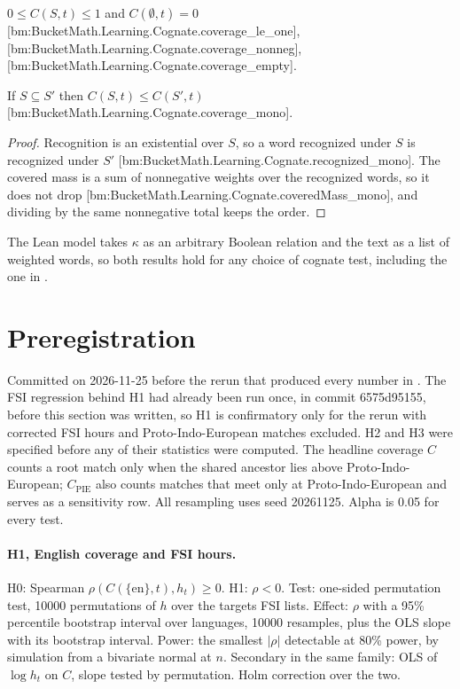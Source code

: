 \documentclass[11pt]{article}
\newcommand{\bm}[1]{{\small[bm:#1]}}
\begin{document}
\begin{lemma}[Bounds]
\label{lem:bounds}
$0\le C(S,t)\le 1$ and $C(\emptyset,t)=0$
\bm{BucketMath.Learning.Cognate.coverage\_le\_one},
\bm{BucketMath.Learning.Cognate.coverage\_nonneg},
\bm{BucketMath.Learning.Cognate.coverage\_empty}.
\end{lemma}

\begin{theorem}[Monotonicity]
\label{thm:mono}
If $S\subseteq S'$ then $C(S,t)\le C(S',t)$
\bm{BucketMath.Learning.Cognate.coverage\_mono}.
\end{theorem}

\begin{proof}
Recognition is an existential over $S$, so a word recognized under $S$ is
recognized under $S'$ \bm{BucketMath.Learning.Cognate.recognized\_mono}.
The covered mass is a sum of nonnegative weights over the recognized
words, so it does not drop \bm{BucketMath.Learning.Cognate.coveredMass\_mono},
and dividing by the same nonnegative total keeps the order.
\end{proof}

The Lean model takes $\kappa$ as an arbitrary Boolean relation and the
text as a list of weighted words, so both results hold for any choice of
cognate test, including the one in .

\section{Preregistration}
\label{sec:prereg}

Committed on 2026-11-25 before the rerun that produced every number in
. The FSI regression behind H1 had already been run once,
in commit 6575d95155, before this section was written, so H1 is
confirmatory only for the rerun with corrected FSI hours and
Proto-Indo-European matches excluded. H2 and H3 were specified before any
of their statistics were computed. The headline coverage $C$ counts a root match only
when the shared ancestor lies above Proto-Indo-European; $C_{\mathrm{PIE}}$
also counts matches that meet only at Proto-Indo-European and serves as a
sensitivity row. All resampling uses seed 20261125. Alpha is 0.05 for
every test.

\paragraph{H1, English coverage and FSI hours.}
H0: Spearman $\rho(C(\{\mathrm{en}\},t), h_t)\ge 0$. H1: $\rho<0$.
Test: one-sided permutation test, 10000 permutations of $h$ over the
targets FSI lists. Effect: $\rho$ with a 95\% percentile bootstrap
interval over languages, 10000 resamples, plus the OLS slope with its
bootstrap interval. Power: the smallest $|\rho|$ detectable at 80\% power,
by simulation from a bivariate normal at $n$. Secondary in the same family:
OLS of $\log h_t$ on $C$, slope tested by permutation. Holm correction
over the two.
\end{document}
